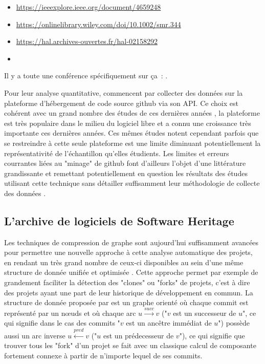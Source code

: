 
\begin{itemize}
    \item \url{https://ieeexplore.ieee.org/document/4659248}
    \item \url{https://onlinelibrary.wiley.com/doi/10.1002/smr.344}
    \item \url{https://hal.archives-ouvertes.fr/hal-02158292}
    \item {}
\end{itemize}

Il y a toute une conférence spécifiquement sur ça : .

Pour leur analyse quantitative, \textcite{signals-2019} commencent par collecter des données sur la plateforme
d'hébergement de code source \gls{github} via son \gls{API}. Ce choix est cohérent avec un grand nombre des
études de ces dernières années , la plateforme est très populaire dans le
milieu du logiciel libre et a connu une croissance très importante ces dernières années. Ces mêmes études
notent cependant parfois que se restreindre à cette seule plateforme est une limite diminuant potentiellement
la représentativité de l'échantillon qu'elles étudients. Les limites et erreurs courrantes liées au "minage"
de \gls{github} font d'ailleurs l'objet d'une littérature grandissante et remettant potentiellement en
question les résultats des études utilisant cette technique sans détailler suffisamment leur méthodologie de
collecte des données \parencites{mining-github-2014}{penumbra-oss-2022}.

\subsection{L'archive de logiciels de Software Heritage}

Les techniques de compression de graphe sont aujourd'hui suffisamment avancées pour permettre une nouvelle
approche à cette analyse automatique des projets, en rendant un très grand nombre de ceux-ci disponibles au
sein d'une même structure de donnée unifiée et optimisée . Cette approche permet
par exemple de grandement faciliter la détection des "\glspl{clone}" ou "\glspl{fork}" de projets, c'est à
dire des projets ayant une part de leur historique de développement en commun. La structure de donnée proposée
par \textcite{swh-graph-2020} est un graphe orienté où chaque \gls{commit} est représenté par un nœuds et où
chaque arc $u \xrightarrow{succ} v$ ("$v$ est un successeur de $u$", ce qui signifie dans le cas des commits
"$v$ est un ancêtre immédiat de $u$") possède aussi un arc inverse $u \xleftarrow{pred} v$ ("$u$ est un
prédecesseur de $v$"), ce qui signifie que trouver tous les "\gls{fork}" d'un projet se fait avec un classique
calcul de composante fortement connexe à partir de n'importe lequel de ses \glspl{commit}.

